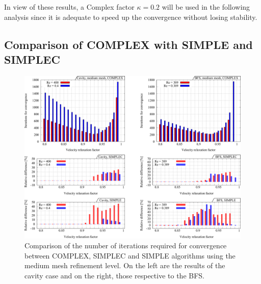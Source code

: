 \documentclass[final,3p,times,11pt,onecolumn]{myElsarticle}
\numberwithin{equation}{section}
\begin{document}
In view of these results, a Complex factor $\kappa = 0.2$ will be used in the following analysis since it is adequate to speed up the convergence without losing stability. %



\subsection{Comparison of COMPLEX with SIMPLE and SIMPLEC}


\begin{figure}[t!]
\centering
\includegraphics[width=15cm]{fig/Results/complexMedium.pdf}
\caption{Comparison of the number of iterations required for convergence between COMPLEX, SIMPLEC and SIMPLE algorithms using the medium mesh refinement level. On the left are the results of the cavity case and on the right, those respective to the BFS.}
\label{Fig:complexMedium}
\end{figure}
\end{document}
